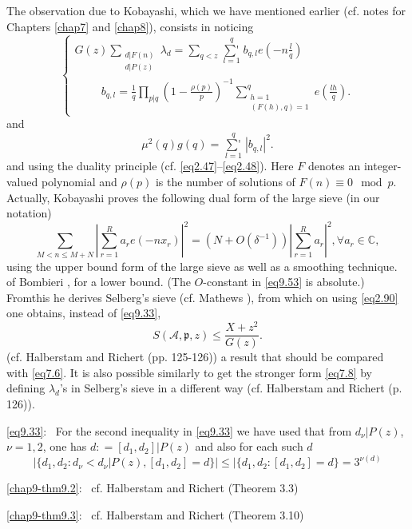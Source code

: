 The observation due to Kobayashi, which we have mentioned earlier
(cf. notes for Chapters \ref{chap7} and \ref{chap8}), consists in noticing  
\begin{equation*}
\begin{cases}
G(z) \sum \limits_{\substack{d|F(n) \\ d|P(z) }} \lambda_d =
\sum\limits_{q < z} \mathop{\sum{}'}\limits^q_{l=1} b_{q,l}e(-n \frac{l}{q})\\  
\hspace{1cm} b_{q,l}= \frac{1}{q} \prod\limits_{p|q}(1-\frac{
  \rho(p)}{p})^{-1} \sum\limits^{q}_{\substack{h=1 \\(F(h), q) = 1}}
e(\frac{lh}{q}).  
\end{cases}\tag{9.51}\label{eq9.51}
\end{equation*}
and 
\begin{equation*}
\mu^2 (q) g(q) =
\mathop{\sum{}'}\limits^q_{l=1}|b_{q,l}|^2.\tag{9.52}\label{eq9.52} 
\end{equation*}
and using the duality principle
(cf. \eqref{eq2.47}--\eqref{eq2.48}). Here $F$ denotes 
an integer-valued polynomial and $\rho(p)$ is the number of solutions
of $F(n)  \equiv 0 \mod p$. Actually, Kobayashi \cite{key1} proves the
following dual form of the large sieve (in our notation) 
\begin{equation*}
\sum_{M<n \leq M+N}| \sum^R_{r=1}a_re(-nx_r)|^2 = (N +O (\delta^{-1}))
| \sum^R_{r=1}a_r|^2, \forall a_r \in \mathbb{C},\tag{9.53}\label{eq9.53} 
 \end{equation*} 
using the upper bound form of the large sieve as well as a smoothing
technique. of Bombieri \cite{key4}, for a lower bound. (The $O$-constant in
\eqref{eq9.53} is absolute.) From\pageoriginale this he derives
Selberg's sieve (cf. Mathews \cite{key3}), from which on using
\eqref{eq2.90} one obtains, instead of \eqref{eq9.33}, 
 \begin{equation*}
S(\mathscr{A},\mathfrak{p},z) \leq
\frac{X+z^2}{G(z)}.\tag{9.54}\label{eq9.54}  
 \end{equation*} 
(cf. Halberstam and Richert \cite{key1} (pp. 125-126)) a result that should
 be compared with \eqref{eq7.6}. It is also possible similarly to get the
 stronger form \eqref{eq7.8} by defining $\lambda_{d}$'s in  Selberg's sieve in
 a different way (cf. Halberstam and Richert \cite{key1} (p. 126)). 

\eqref{eq9.33}:~ For the second inequality in \eqref{eq9.33} we have used
that from $d_{\nu}|P(z)$, $\nu = 1,2$, one has $d: = [d_1, d_2]|P(z)$ and
also for each such $d$ 
 \begin{equation*}
|\{ d_1, d_2:d_{\nu}< d_{\nu}| P(z) ,[d_1, d_2]= d \} | \leq | \{d_1,
d_2:[d_1, d_2]= d  \}= 3^{\nu (d)}\tag{9.55}\label{eq9.55} 
 \end{equation*} 

\ref{chap9-thm9.2}:~ cf. Halberstam and Richert \cite{key1} (Theorem 3.3) 

\ref{chap9-thm9.3}:~ cf. Halberstam and Richert \cite{key1} (Theorem
3.10) 

